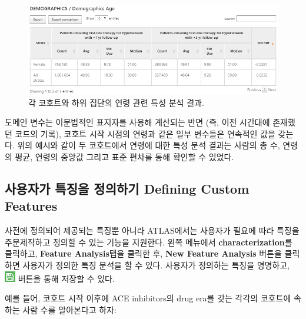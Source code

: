 \documentclass[11pt]{book}
\theoremstyle{definition}
\theoremstyle{definition}
\theoremstyle{definition}
\theoremstyle{remark}
\begin{document}
\begin{figure}

{\centering \includegraphics[width=1\linewidth]{images/Characterization/atlasCharacterizationResultsContinuous} 

}

\caption{각 코호트와 하위 집단의 연령 관련 특성 분석 결과.}\label{fig:atlasCharacterizationResultsContinuous}
\end{figure}

도메인 변수는 이분법적인 표지자를 사용해 계산되는 반면 (즉, 이전
시간대에 존재했던 코드의 기록), 코호트 시작 시점의 연령과 같은 일부
변수들은 연속적인 값을 갖는다. 위의 예시와 같이 두 코호트에서 연령에
대한 특성 분석 결과는 사람의 총 수, 연령의 평균, 연령의 중앙값 그리고
표준 편차를 통해 확인할 수 있었다.

\subsection{사용자가 특징을 정의하기 Defining Custom
Features}\label{---defining-custom-features}

사전에 정의되어 제공되는 특징뿐 아니라 ATLAS에서는 사용자가 필요에 따라
특징을 주문제작하고 정의할 수 있는 기능을 지원한다. 왼쪽 메뉴에서
\textbf{characterization}를 클릭하고, \textbf{Feature Analysis}탭을
클릭한 후, \textbf{New Feature Analysis} 버튼을 클릭하면 사용자가 정의한
특징 분석을 할 수 있다. 사용자가 정의하는 특징을 명명하고,
\includegraphics{images/PopulationLevelEstimation/save.png} 버튼을 통해
저장할 수 있다. 

예를 들어, 코호트 시작 이후에 ACE inhibitors의 drug era를 갖는 각각의
코호트에 속하는 사람 수를 알아본다고 하자:
\end{document}
